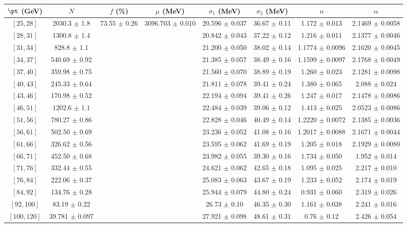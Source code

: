 \begin{tabular}{c||c|c|c|c|c|c|c}
$\pt$ (GeV) & $N$ & $f$ (\%) & $\mu$ (MeV) & $\sigma_1$ (MeV) & $\sigma_2$ (MeV) & $n$ & $\alpha$ \\
\hline
$[25, 28]$ & 2030.3 $\pm$ 1.8 & \multirow{17}{*}{73.55 $\pm$ 0.26} & \multirow{17}{*}{3096.703 $\pm$ 0.010} & 20.596 $\pm$ 0.037 & 36.67 $\pm$ 0.11 & 1.172 $\pm$ 0.013 & 2.1469 $\pm$ 0.0058\\
$[28, 31]$ & 1300.8 $\pm$ 1.4 &  &  & 20.842 $\pm$ 0.043 & 37.22 $\pm$ 0.12 & 1.216 $\pm$ 0.011 & 2.1377 $\pm$ 0.0046\\
$[31, 34]$ & 828.8 $\pm$ 1.1 &  &  & 21.200 $\pm$ 0.050 & 38.02 $\pm$ 0.14 & 1.1774 $\pm$ 0.0096 & 2.1620 $\pm$ 0.0045\\
$[34, 37]$ & 540.69 $\pm$ 0.92 &  &  & 21.385 $\pm$ 0.057 & 38.49 $\pm$ 0.16 & 1.1599 $\pm$ 0.0097 & 2.1768 $\pm$ 0.0049\\
$[37, 40]$ & 359.98 $\pm$ 0.75 &  &  & 21.560 $\pm$ 0.070 & 38.89 $\pm$ 0.19 & 1.260 $\pm$ 0.023 & 2.1281 $\pm$ 0.0098\\
$[40, 43]$ & 245.33 $\pm$ 0.64 &  &  & 21.811 $\pm$ 0.078 & 39.41 $\pm$ 0.24 & 1.380 $\pm$ 0.065 & 2.088 $\pm$ 0.024\\
$[43, 46]$ & 170.98 $\pm$ 0.52 &  &  & 22.194 $\pm$ 0.094 & 39.41 $\pm$ 0.26 & 1.247 $\pm$ 0.017 & 2.1478 $\pm$ 0.0086\\
$[46, 51]$ & 1202.6 $\pm$ 1.1 &  &  & 22.484 $\pm$ 0.039 & 39.06 $\pm$ 0.12 & 1.413 $\pm$ 0.025 & 2.0523 $\pm$ 0.0086\\
$[51, 56]$ & 780.27 $\pm$ 0.86 &  &  & 22.828 $\pm$ 0.046 & 40.49 $\pm$ 0.14 & 1.2220 $\pm$ 0.0072 & 2.1385 $\pm$ 0.0036\\
$[56, 61]$ & 502.50 $\pm$ 0.69 &  &  & 23.236 $\pm$ 0.052 & 41.08 $\pm$ 0.16 & 1.2017 $\pm$ 0.0088 & 2.1671 $\pm$ 0.0044\\
$[61, 66]$ & 326.62 $\pm$ 0.56 &  &  & 23.595 $\pm$ 0.062 & 41.69 $\pm$ 0.19 & 1.205 $\pm$ 0.018 & 2.1929 $\pm$ 0.0080\\
$[66, 71]$ & 452.50 $\pm$ 0.68 &  &  & 23.982 $\pm$ 0.055 & 39.30 $\pm$ 0.16 & 1.734 $\pm$ 0.050 & 1.952 $\pm$ 0.014\\
$[71, 76]$ & 332.44 $\pm$ 0.55 &  &  & 24.621 $\pm$ 0.062 & 42.65 $\pm$ 0.18 & 1.095 $\pm$ 0.025 & 2.217 $\pm$ 0.010\\
$[76, 84]$ & 222.06 $\pm$ 0.37 &  &  & 25.083 $\pm$ 0.063 & 43.67 $\pm$ 0.19 & 1.233 $\pm$ 0.052 & 2.174 $\pm$ 0.019\\
$[84, 92]$ & 134.76 $\pm$ 0.28 &  &  & 25.944 $\pm$ 0.079 & 44.80 $\pm$ 0.24 & 0.931 $\pm$ 0.060 & 2.319 $\pm$ 0.026\\
$[92, 100]$ & 83.19 $\pm$ 0.22 &  &  & 26.73 $\pm$ 0.10 & 46.35 $\pm$ 0.30 & 1.161 $\pm$ 0.038 & 2.241 $\pm$ 0.016\\
$[100, 120]$ & 39.781 $\pm$ 0.097 &  &  & 27.921 $\pm$ 0.098 & 48.61 $\pm$ 0.31 & 0.76 $\pm$ 0.12 & 2.426 $\pm$ 0.054\\
\end{tabular}
